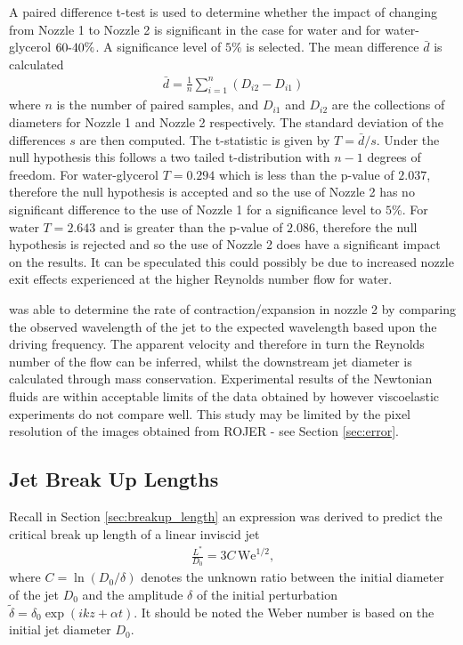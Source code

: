 \documentclass[11pt]{article}
\begin{document}
A paired difference t-test is used to determine whether the impact of changing from Nozzle 1 to Nozzle 2 is significant in the case for water and for water-glycerol $60 {\text -} 40 \%$. A significance level of $5\%$ is selected. The mean difference $\bar{d}$ is calculated
\begin{align*}
\bar{d} = \frac{1}{n} \sum^n_{i=1} \left(D_{i2} - D_{i1} \right)
\end{align*}
where $n$ is the number of paired samples, and $D_{i1}$ and $D_{i2}$ are the collections of diameters for Nozzle 1 and Nozzle 2 respectively. The standard deviation of the differences $s$ are then computed. The t-statistic is given by
$T = \bar{d}/s$. Under the null hypothesis this follows a two tailed t-distribution with $n-1$ degrees of freedom. For water-glycerol $T = 0.294$ which is less than the p-value of $2.037$, therefore the null hypothesis is accepted and so the use of Nozzle 2 has no significant difference to the use of Nozzle 1 for a significance level to $5 \%$. For water $T = 2.643$ and is greater than the p-value of $2.086$, therefore the null hypothesis is rejected and so the use of Nozzle 2 does have a significant impact on the results. It can be speculated this could possibly be due to increased nozzle exit effects experienced at the higher Reynolds number flow for water. 

\cite{greiciunas2015report} was able to determine the rate of contraction/expansion in nozzle 2 by comparing the observed wavelength of the jet to the expected wavelength based upon the driving frequency. The apparent velocity and therefore in turn the Reynolds number of the flow can be inferred, whilst the downstream jet diameter is calculated through mass conservation. Experimental results of the Newtonian fluids are within acceptable limits of the data obtained by \cite{middleman1961expansion} however viscoelastic experiments do not compare well. This study may be limited by the pixel resolution of the images obtained from ROJER - see Section \ref{sec:error}.

\subsection{Jet Break Up Lengths} \label{sec:exp_breakup}
Recall in Section \ref{sec:breakup_length} an expression was derived to predict the critical break up length of a linear inviscid jet
\begin{align}
\frac{L^*}{D_0} = 3C \, \mathrm{We}^{1/2},
\label{eqn:inviscid_breakup}
\end{align}
where $C = \ln \left( D_0 / \delta  \right)$ denotes the unknown ratio between the initial diameter of the jet $D_0$ and the amplitude $\delta$ of the initial perturbation $\tilde{\delta} = \delta_0 \exp (ikz + \alpha t)$. It should be noted the Weber number is based on the initial jet diameter $D_0$. 
\end{document}

